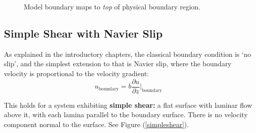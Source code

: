 \documentclass[12pt, a4paper, twoside, openright]{book}
\begin{document}
\begin{figure}[ht]
\centering
{}
\caption{Model boundary maps to \emph{top} of physical boundary region.}\label{boundarymap}
\end{figure}

\clearpage
\subsection{Simple Shear with Navier Slip}

As explained in the introductory chapters, the classical boundary condition is `no slip', and the simplest extension to that is Navier slip, where the boundary velocity is proportional to the velocity gradient:
\begin{equation}
u_{\text{boundary}} = b \frac{\partial u}{\partial z} \bigg|_{\text{boundary}}
\end{equation}

This holds for a system exhibiting \textbf{simple shear:} a flat surface with laminar flow above it, with each lamina parallel to the boundary surface.  There is no velocity component normal to the surface.  See Figure (\ref{simpleshear}).
\end{document}
